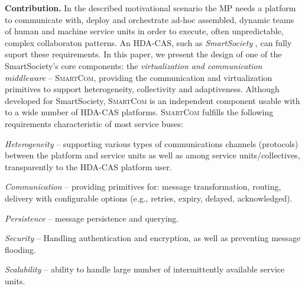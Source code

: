 \documentclass{llncs}
\newcommand{\mdl}{\textsc{SmartCom}}
\begin{document}
  \textbf{Contribution. }
  In the described motivational scenario the MP needs a platform to communicate with, deploy and orchestrate ad-hoc assembled, dynamic teams of human and machine service units in order to execute, often unpredictable, complex collaboraton patterns. An HDA-CAS, such as \textit{SmartSociety} \cite{SmartSocBook}, can fully suport these  requirements. In this paper, we present the design of one of the SmartSociety's core components: the \emph{virtualization and communication middleware} -- \mdl{}, providing the communication and virtualization primitives to support heterogeneity, collectivity and adaptiveness. Although developed for SmartSociety, \mdl{} is an independent component usable with to a wide number of HDA-CAS platforms.
%
%
%
   \mdl{} fulfills the following requirements characteristic of most service buses:
     \begin{inparaenum}[a) \itshape]
        \item \textit{Heterogeneity} -- supporting various types of communications channels (protocols) between the platform and service units as well as among service units/collectives, transparently to the HDA-CAS platform user.
        \item \textit{Communication} -- providing primitives for: message transformation, routing, delivery with configurable options (e.g., retries, expiry, delayed, acknowledged).
        \item \textit{Persistence} -- message persistence and querying.
        \item \textit{Security} -- Handling authentication and encryption, as well as preventing message flooding.
        \item \textit{Scalability} -- ability to handle large number of intermittently available service units.
      \end{inparaenum}
\end{document}
